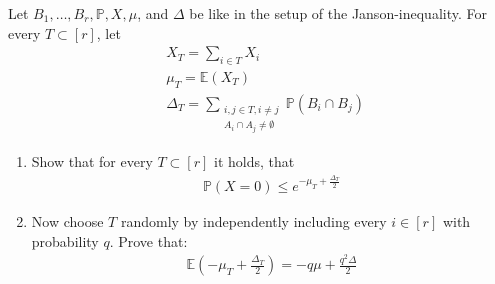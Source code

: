 \begin{problem}
  Let $B_{1}, \ldots, B_{r}, \mathbb{P}, X, \mu$, and $\Delta$ be like in the setup of the Janson-inequality. For every $T \subset [r]$, let
  \begin{align*}
    & X_{T} = \sum\limits_{i \in T}X_{i} \\
    & \mu_{T} = \mathbb{E}(X_{T}) \\
    & \Delta_{T} = \sum\limits_{\substack{i,j \in T, i \neq j \\ A_{i} \cap A_{j} \neq \emptyset}} \mathbb{P}(B_{i} \cap B_{j})
  \end{align*}
  \begin{enumerate}[label=(\roman*)]
    \item Show that for every $T \subset [r]$ it holds, that
      \begin{align*}
        \mathbb{P}(X=0) \leq e^{-\mu_{T} + \frac{\Delta_{T}}{2}}
      \end{align*}
    \item Now choose $T$ randomly by independently including every $i \in [r]$ with probability $q$. Prove that:
      \begin{align*}
        \mathbb{E}(-\mu_{T} + \frac{\Delta_{T}}{2})  = -q\mu + \frac{q^{2}\Delta}{2}
      \end{align*}
  \end{enumerate}
\end{problem}
